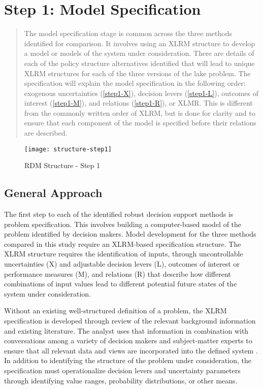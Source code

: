 \chapter{Step 1: Model Specification}\label{dev-step1}

\begin{abstract}
    The model specification stage is common across the three methods identified for comparison. It involves using an XLRM structure to develop a model or models of the system under consideration. There are details of each of the policy structure alternatives identified that will lead to unique XLRM structures for each of the three versions of the lake problem. The specification will explain the model specification in the following order: exogenous uncertainties (\cref{step1-X}), decision levers (\cref{step1-L}), outcomes of interest (\cref{step1-M}), and relations (\cref{step1-R}), or XLMR. This is different from the commonly written order of XLRM, but is done for clarity and to ensure that each component of the model is specified before their relations are described. 
\end{abstract}

\medskip

\begin{figure}[h]
    \centering
    \captionsetup{justification=centering}
    
    \texttt{[image: structure-step1]}
    \caption{RDM Structure - Step 1}
    \label{fig:structure-step1}
\end{figure}

\newpage

\section{General Approach}
The first step to each of the identified robust decision support methods is problem specification. This involves building a computer-based model of the problem identified by decision makers. Model development for the three methods compared in this study require an XLRM-based specification structure. The XLRM structure requires the identification of inputs, through uncontrollable uncertainties (X) and adjustable decision levers (L), outcomes of interest or performance measures (M), and relations (R) that describe how different combinations of input values lead to different potential future states of the system under consideration. 

Without an existing well-structured definition of a problem, the XLRM specification is developed through review of the relevant background information and existing literature. The analyst uses that information in combination with conversations among a variety of decision makers and subject-matter experts to ensure that all relevant data and views are incorporated into the defined system \citep{Lempert2003}. In addition to identifying the structure of the problem under consideration, the specification must operationalize decision levers and uncertainty parameters through identifying value ranges, probability distributions, or other means. 

